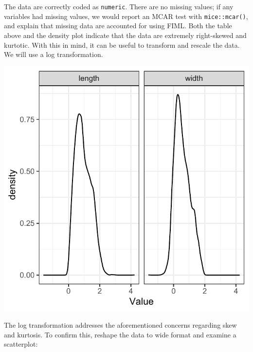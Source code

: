 \documentclass[
  man,floatsintext]{apa6}
\newenvironment{Shaded}{\begin{snugshade}}{\end{snugshade}}
\newcommand{\AttributeTok}[1]{\textcolor[rgb]{0.77,0.63,0.00}{#1}}
\newcommand{\FunctionTok}[1]{\textcolor[rgb]{0.00,0.00,0.00}{#1}}
\newcommand{\NormalTok}[1]{#1}
\newcommand{\OtherTok}[1]{\textcolor[rgb]{0.56,0.35,0.01}{#1}}
\newcommand{\SpecialCharTok}[1]{\textcolor[rgb]{0.00,0.00,0.00}{#1}}
\begin{document}
The data are correctly coded as \texttt{numeric}.
There are no missing values; if any variables had missing values, we would report an MCAR test with \texttt{mice::mcar()}, and explain that missing data are accounted for using FIML.
Both the table above and the density plot indicate that the data are extremely right-skewed and kurtotic.
With this in mind, it can be useful to transform and rescale the data.
We will use a log transformation.

\begin{Shaded}
\end{Shaded}

\includegraphics{appendices/plot_gmm_desc_log.pdf}

The log transformation addresses the aforementioned concerns regarding skew and kurtosis.
To confirm this, reshape the data to wide format and examine a scatterplot:
\end{document}
